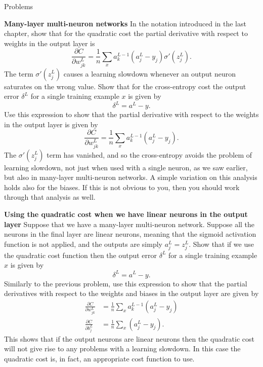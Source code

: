 \documentclass[a4paper,twoside,10pt]{book}
\begin{document}
\begin{exercize}{Problems}
	\item \textbf{Many-layer multi-neuron networks} In the notation introduced in the last chapter, show that for the quadratic cost the partial derivative with respect to weights in the output layer is
	\begin{equation}
		\frac{\partial C}{\partial w^L_{jk}}  = \frac{1}{n}
		\sum_x a^{L-1}_k  (a^L_j-y_j) \sigma'(z^L_j).
		\label{eq:65}
	\end{equation}%
	The term $\sigma'(z^L_j)$ causes a learning slowdown whenever an output neuron saturates on the wrong value. Show that for the cross-entropy cost the output error 
	$\delta^L$ for a single training example $x$ is given by
	\begin{equation}
		\delta^L = a^L - y.\label{eq:66}
	\end{equation}%
	Use this expression to show that the partial derivative with respect to the weights in the output layer is given by
	\begin{equation}
		\frac{\partial C}{\partial w^L_{jk}}  =  \frac{1}{n} \sum_x 	a^{L-1}_k  (a^L_j-y_j).
		\label{eq:67}
	\end{equation}%
	The $\sigma'(z^L_j)$ term has vanished, and so the cross-entropy avoids the problem of learning slowdown, not just when used with a single neuron, as we saw earlier, but also in many-layer multi-neuron networks. A simple variation on this analysis holds also for the biases. If this is not obvious to you, then you should work through that analysis as well.
	\item \textbf{Using the quadratic cost when we have linear neurons in the output layer} Suppose that we have a many-layer multi-neuron network. Suppose all the neurons in the final layer are linear neurons, meaning that the sigmoid activation function is not applied, and the outputs are simply $a^L_j=z^L_j$. Show that if we use the quadratic cost function then the output error $\delta^L$ for a single training example $x$ is given by
	\begin{equation}
		\delta^L = a^L-y.
		\label{eq:68}
	\end{equation}%
	Similarly to the previous problem, use this expression to show that the partial derivatives with respect to the weights and biases in the output layer are given by
	\begin{align}
	\frac{\partial C}{\partial w^L_{jk}} &=  \frac{1}{n} \sum_x a^{L-1}_k  (a^L_j-y_j)\label{eq:69}\\
	\frac{\partial C}{\partial b^L_{j}} &=  \frac{1}{n} \sum_x (a^L_j-y_j).
	\label{eq:70}
	\end{align}
	This shows that if the output neurons are linear neurons then the quadratic cost will not give rise to any problems with a learning slowdown. In this case the quadratic cost is, in fact, an appropriate cost function to use.
\end{exercize}
\end{document}

